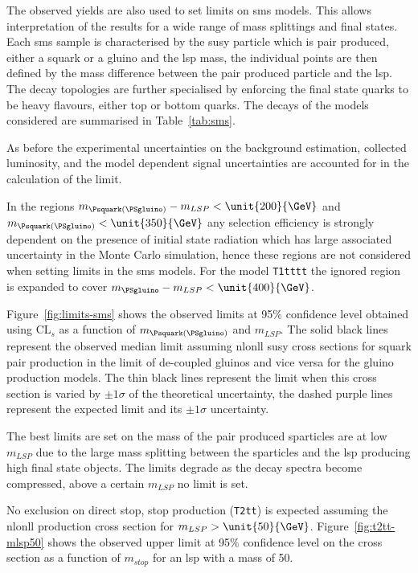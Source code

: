 The observed yields are also used to set limits on \ac{sms} models. This allows 
interpretation of the results for a wide range of mass splittings and final 
states. Each \ac{sms} sample is characterised by the \ac{susy} particle which 
is pair produced, either a squark or a gluino and the \ac{lsp} mass, the 
individual points are then defined by the mass difference between the pair 
produced particle and the \ac{lsp}.
The decay topologies are further specialised by enforcing the final state 
quarks to be heavy flavours, either top or bottom quarks. The decays of the 
models considered are summarised in Table~\ref{tab:sms}.

As before the experimental uncertainties on the background estimation, 
collected luminosity, and the model dependent  signal uncertainties are 
accounted for in the calculation of the limit.

In the regions $m_{\Psquark(\PSgluino)} - m_{LSP} < \unit{200}{\GeV}$ and 
$m_{\Psquark(\PSgluino)} < \unit{350}{\GeV}$ any selection efficiency is 
strongly dependent  on the presence of initial state radiation which has large 
associated uncertainty in the Monte Carlo simulation, hence these regions are 
not considered when setting limits in the \ac{sms} models. For the model 
\texttt{T1tttt} the ignored region is expanded to cover $m_{\PSgluino} - 
m_{LSP} < \unit{400}{\GeV}$.

Figure~\ref{fig:limits-sms} shows the observed limits at 95$\%$ confidence level obtained using CL$_{s}$ as a function of $m_{\Psquark(\PSgluino)}$ and $m_{LSP}$. The solid black lines represent the observed median limit assuming \ac{nlonll}\cite{Beenakker:1996ch,susy-nlo-nll} \ac{susy} cross sections for squark pair production in the limit of de-coupled gluinos and vice versa for the gluino production models. The thin black lines represent the limit when this cross section is varied by $\pm1\sigma$ of the theoretical uncertainty, the dashed purple lines represent the expected limit and its $\pm1\sigma$ uncertainty.

The best limits are set on the mass of the pair produced sparticles are at low $m_{LSP}$ due to the large mass splitting between the sparticles and the \ac{lsp} producing high \pt final state objects. The limits degrade as the decay spectra become compressed, above a certain $m_{LSP}$ no limit is set.

No exclusion on direct stop, stop production (\texttt{T2tt}) is expected assuming the \ac{nlonll} production cross section for $m_{LSP} > \unit{50}{\GeV}$. Figure~\ref{fig:t2tt-mlsp50} shows the observed upper limit at 95$\%$ confidence level on the cross section as a function of $m_{stop}$ for an \ac{lsp} with a mass of \unit{50}{\GeV}.


